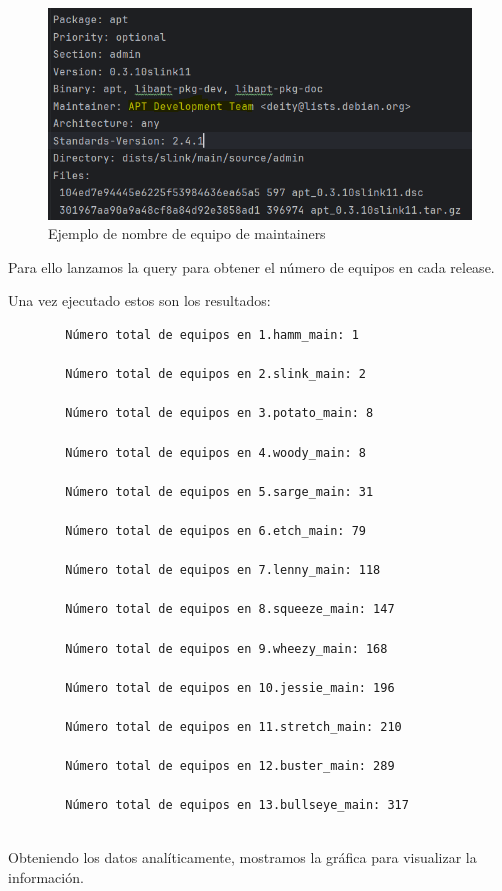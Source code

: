 \documentclass[a4paper, 12pt]{book}
\begin{document}
\begin{figure}
	\centering
	\includegraphics[width=15cm, keepaspectratio]{img/Ejemplo equipo 2.png}
	\caption{Ejemplo de nombre de equipo de maintainers}
	\label{fig:ejemplo_equipo_2}
\end{figure}

Para ello lanzamos la query para obtener el número de equipos en cada release.

Una vez ejecutado estos son los resultados:

	\begin{verbatim}
		Número total de equipos en 1.hamm_main: 1
		
		Número total de equipos en 2.slink_main: 2
		
		Número total de equipos en 3.potato_main: 8
		
		Número total de equipos en 4.woody_main: 8
		
		Número total de equipos en 5.sarge_main: 31
		
		Número total de equipos en 6.etch_main: 79
		
		Número total de equipos en 7.lenny_main: 118
		
		Número total de equipos en 8.squeeze_main: 147
		
		Número total de equipos en 9.wheezy_main: 168
		
		Número total de equipos en 10.jessie_main: 196
		
		Número total de equipos en 11.stretch_main: 210
		
		Número total de equipos en 12.buster_main: 289
		
		Número total de equipos en 13.bullseye_main: 317
		
	\end{verbatim} 

Obteniendo los datos analíticamente, mostramos la gráfica para visualizar la información.
\end{document}
